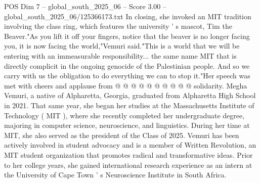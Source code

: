 \begin{textsample}{POS Dim 7 – global\_south\_2025\_06 – Score 3.00 – global\_south\_2025\_06/125366173.txt}
In closing, she invoked an MIT tradition involving the class ring, which features the university ' s mascot, Tim the Beaver."As you lift it off your fingers, notice that the beaver is no longer facing you, it is now facing the world,"Vemuri said."This is a world that we will be entering with an immeasurable responsibility... the same name MIT that is directly complicit in the ongoing genocide of the Palestinian people.
And so we carry with us the obligation to do everything we can to stop it."Her speech was met with cheers and applause from @ @ @ @ @ @ @ @ @ @ solidarity.
Megha Vemuri, a native of Alpharetta, Georgia, graduated from Alpharetta High School in 2021.
That same year, she began her studies at the Massachusetts Institute of Technology ( MIT ), where she recently completed her undergraduate degree, majoring in computer science, neuroscience, and linguistics.
During her time at MIT, she also served as the president of the Class of 2025.
Vemuri has been actively involved in student advocacy and is a member of Written Revolution, an MIT student organization that promotes radical and transformative ideas.
Prior to her college years, she gained international research experience as an intern at the University of Cape Town ' s Neuroscience Institute in South Africa.

\end{textsample}
